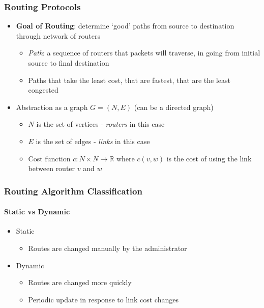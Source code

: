 \subsubsection{Routing Protocols}
\begin{itemize}
	\item \textbf{Goal of Routing}: determine `good' paths from source to destination through network of routers
	\begin{itemize}
		\item \textit{Path}: a sequence of routers that packets will traverse, in going from initial source to final destination
		\item Paths that take the least cost, that are fastest, that are the least congested
	\end{itemize}
	\item Abstraction as a graph \(G = (N, E)\) (can be a directed graph)
	\begin{itemize}
		\item \(N\) is the set of vertices - \textit{routers} in this case
		\item \(E\) is the set of edges - \textit{links} in this case
		\item Cost function \(c: N\times N \rightarrow \mathbb{R}\) where \(c(v, w)\) is the cost of using the link between router \(v\) and \(w\)
	\end{itemize}
\end{itemize}

\subsubsection{Routing Algorithm Classification}
\paragraph{Static vs Dynamic}
\begin{itemize}
	\item Static
	\begin{itemize}
		\item Routes are changed manually by the administrator
	\end{itemize}
	\item Dynamic
	\begin{itemize}
		\item Routes are changed more quickly
		\item Periodic update in response to link cost changes
	\end{itemize}
\end{itemize}

